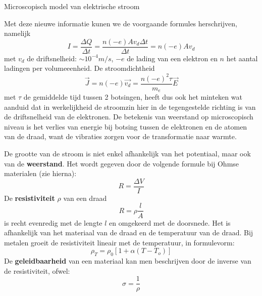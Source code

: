 \begin{app}{Microscopisch model van elektrische stroom}
\begin{center}
    \end{center}
    Met deze nieuwe informatie kunen we de voorgaande formules herschrijven, namelijk
    \begin{equation*}
        I = \dfrac{\Delta Q}{\Delta t} = \dfrac{n(-e)Av_d\Delta t}{\Delta t} = n(-e)Av_d
    \end{equation*}
    met $v_d$ de driftsnelheid: $\sim 10^{-4} m/s$, $-e$ de lading van een elektron en $n$ het aantal ladingen per volumeeenheid. De stroomdichtheid
    \begin{equation*}
        \Vec{J} = n(-e)\Vec{v_d} = \dfrac{n(-e)^2\tau}{m_e}\Vec{E}
    \end{equation*}
    met $\tau$ de gemiddelde tijd tussen 2 botsingen, heeft dus ook het minteken wat aanduid dat in werkelijkheid de stroomzin hier in de tegengestelde richting is van de driftsnelheid van de elektronen. De betekenis van weerstand op microscopisch niveau is het verlies van energie bij botsing tussen de elektronen en de atomen van de draad, want de vibraties zorgen voor de transformatie naar warmte.
\end{app}

\begin{theo}{}
    De grootte van de stroom is niet enkel afhankelijk van het potentiaal, maar ook van de \textbf{weerstand}. Het wordt gegeven door de volgende formule bij Ohmse materialen (zie hierna):
    \begin{equation*}
        R = \dfrac{\Delta V}{I} 
    \end{equation*}
    De \textbf{resistiviteit} $\rho$ van een draad 
    \begin{equation*}
        R = \rho \dfrac{l}{A}
    \end{equation*}
    is recht evenredig met de lengte $l$ en omgekeerd met de doorsnede. Het is afhankelijk van het materiaal van de draad en de temperatuur van de draad. Bij metalen groeit de resistiviteit lineair met de temperatuur, in formulevorm:
    \begin{equation*}
        \rho_T = \rho_0[1+\alpha(T-T_o)]
    \end{equation*}
    De \textbf{geleidbaarheid} van een materiaal kan men beschrijven door de inverse van de resistiviteit, ofwel:
    \begin{equation*}
        \sigma = \dfrac{1}{\rho}
    \end{equation*}
    \vspace{-0.5cm}
\end{theo}

